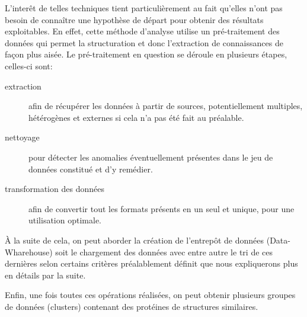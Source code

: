 L'inter\^et de telles techniques tient particulièrement au fait qu'elles n'ont pas besoin de connaître une hypothèse de départ pour obtenir des résultats exploitables. En effet, cette méthode d'analyse utilise un pré-traitement des données qui permet la structuration et donc l'extraction de connaissances de façon plus aisée. Le pré-traitement en question se déroule en plusieurs étapes, celles-ci sont:
\begin{description}
\item[extraction] afin de récupérer les données à partir de sources, potentiellement multiples, hétérogènes et externes si cela n'a pas été fait au préalable.
\item[nettoyage] pour détecter les anomalies éventuellement présentes dans le jeu de données constitué et d'y remédier.
\item[transformation des données] afin de convertir tout les formats présents en un seul et unique, pour une utilisation optimale.
\end{description}

À la suite de cela, on peut aborder la création de l'entrepôt de données (Data-Wharehouse) soit le chargement des données avec entre autre le tri de ces dernières selon certains critères préalablement définit que nous expliquerons plus en détails par la suite.

Enfin, une fois toutes ces opérations réalisées, on peut obtenir plusieurs groupes de données (clusters) contenant des protéines de structures similaires.
